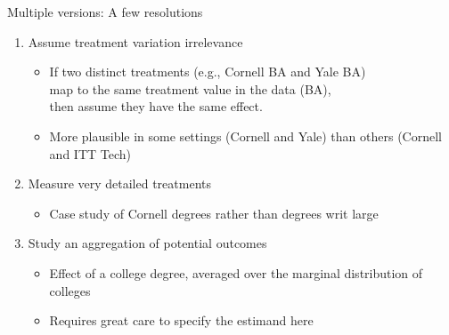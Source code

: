 \documentclass{beamer}
\newcommand\blue[1]{\color{blue}#1}
\begin{document}
\begin{frame}{Multiple versions: A few resolutions}

\pause
\begin{enumerate}[<+->]
\item Assume treatment variation irrelevance
\begin{itemize}
\item If two distinct treatments (e.g., Cornell BA and Yale BA)\\map to the same treatment value in the data (BA),\\then assume they have the same effect.
\item More plausible in some settings (Cornell and Yale) than others (Cornell and ITT Tech)
\end{itemize}
\item Measure very detailed treatments
\begin{itemize}
\item Case study of Cornell degrees rather than degrees writ large
\end{itemize}
\item Study an aggregation of potential outcomes
\begin{itemize}
\item Effect of a college degree, averaged over the marginal distribution of colleges
\item Requires great care to specify the estimand here
\end{itemize}
\end{enumerate}

\end{frame}

\end{document}
